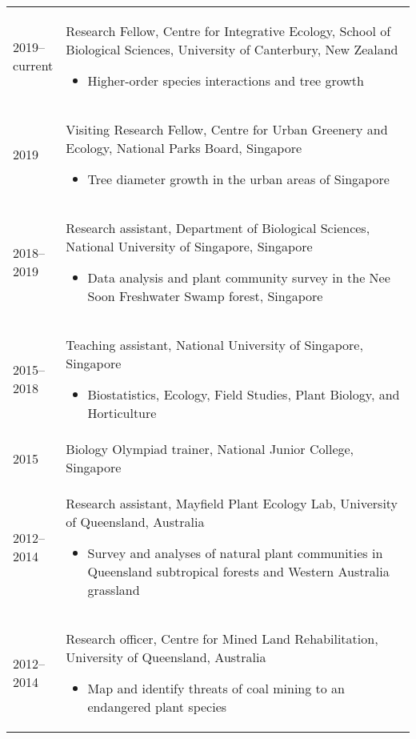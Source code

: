 \documentclass[a4paper]{article}
\begin{document}
\begin{tabular}{p{0.13\linewidth} p{0.87\linewidth}}

2019--current & Research Fellow, Centre for Integrative Ecology, School of Biological Sciences, University of Canterbury, New Zealand
\begin{itemize} 
\item Higher-order species interactions and tree growth
\end{itemize} \\

2019 & Visiting Research Fellow, Centre for Urban Greenery and Ecology, National Parks Board, Singapore
\begin{itemize} 
\item Tree diameter growth in the urban areas of Singapore
\end{itemize} \\

2018--2019 & Research assistant, Department of Biological Sciences, National University of Singapore, Singapore
\begin{itemize} 
\item Data analysis and plant community survey in the Nee Soon Freshwater Swamp forest, Singapore
\end{itemize} \\

2015--2018 & Teaching assistant, National University of Singapore, Singapore
\begin{itemize} 
\item Biostatistics, Ecology, Field Studies, Plant Biology, and Horticulture
\end{itemize} \\

2015 & Biology Olympiad trainer, National Junior College, Singapore \\

2012--2014 & Research assistant, Mayfield Plant Ecology Lab, University of Queensland, Australia 
\begin{itemize}
\item Survey and analyses of natural plant communities in Queensland subtropical forests and Western Australia grassland 
\end{itemize} \\

2012--2014 & Research officer, Centre for Mined Land Rehabilitation, University of Queensland, Australia
\begin{itemize} 
\item Map and identify threats of coal mining to an endangered plant species
\end{itemize} \\


\end{tabular}
\end{document}
